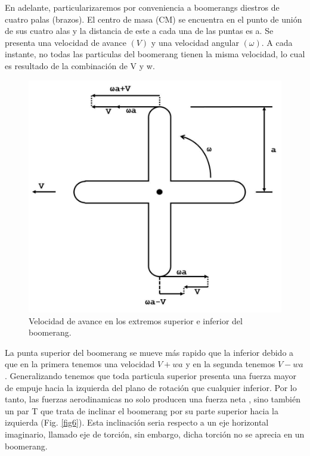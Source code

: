 	En adelante, particularizaremos por conveniencia a boomerangs diestros de cuatro palas (brazos). El centro de masa (CM) se encuentra en el punto de unión de sus cuatro alas y la distancia de este a cada una de las puntas es a. Se presenta una velocidad de avance $(V)$ y una velocidad angular $(\omega)$. A cada instante, no todas las particulas del boomerang tienen la misma velocidad, lo cual es resultado de la combinación de V y w.

		\begin{figure}[ht]
		\begin{center}
		\includegraphics[scale=0.205]{imagenes/3-boomerang/upwardPointingEndofBoomerang.png}
		\caption{Velocidad de avance en los extremos superior e inferior del boomerang.}
		\label{fig5}
		\end{center}
		\end{figure}

	La punta superior del boomerang se mueve más rapido que la inferior debido a que en la primera tenemos una velocidad $V+wa$ y en la segunda tenemos $V-wa$. Generalizando tenemos que toda particula superior presenta una fuerza mayor de empuje hacia la izquierda del plano de rotación que cualquier inferior. Por lo tanto, las fuerzas aerodinamicas no solo producen una fuerza neta , sino también un par T que trata de inclinar el boomerang por su parte superior hacia la izquierda (Fig. \ref{fig6}). Esta inclinación seria respecto a un eje horizontal imaginario, llamado eje de torción, sin embargo, dicha torción no se aprecia en un boomerang.

